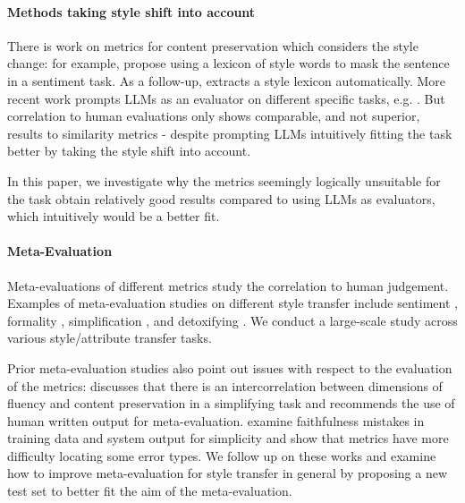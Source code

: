 \paragraph{Methods taking style shift into account}
There is work on metrics for content preservation which considers the style change: for example, \citet{mir-etal-2019-evaluating} propose using a lexicon of style words to mask the sentence in a sentiment task. As a follow-up,  \citet{yu-etal-2021-rethinking-sentiment} extracts a style lexicon automatically. More recent work prompts LLMs as an evaluator on different specific tasks, e.g. \cite{zeng2024bat,lai2023multidimensional,ostheimer-etal-2024-text}. But correlation to human evaluations only shows comparable, and not superior, results to similarity metrics \cite{lai2023multidimensional,ostheimer-etal-2024-text} - despite prompting LLMs intuitively fitting the task better by taking the style shift into account. 

In this paper, we investigate why the metrics seemingly logically unsuitable for the task obtain relatively good results compared to using LLMs as evaluators, which intuitively would be a better fit.

\paragraph{Meta-Evaluation}
Meta-evaluations of different metrics study the correlation to human judgement. Examples of meta-evaluation studies on different style transfer include sentiment \cite{yu-etal-2021-rethinking-sentiment,mir-etal-2019-evaluating,ostheimer-etal-2024-text}, formality \cite{briakou-etal-2021-evaluating,lai-etal-2022-human}, simplification  \cite{scialom2021rethinking, alva-manchego-etal-2021-un, cao-etal-2020-expertise}, and detoxifying \cite{logacheva-etal-2022-study}. We conduct a large-scale study across various style/attribute transfer tasks.

Prior meta-evaluation studies also point out issues with respect to the evaluation of the metrics: \citet{scialom2021rethinking} discusses that there is an intercorrelation between dimensions of fluency and content preservation in a simplifying task and recommends the use of human written output for meta-evaluation. \citet{devaraj-etal-2022-evaluating} examine faithfulness mistakes in training data and system output for simplicity and show that metrics have more difficulty locating some error types. We follow up on these works and examine how to improve meta-evaluation for style transfer in general by proposing a new test set to better fit the aim of the meta-evaluation.
